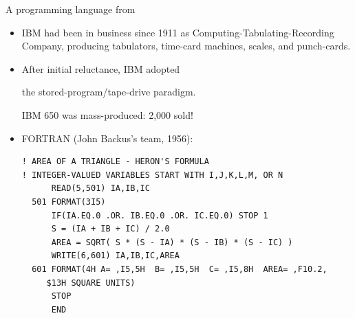 \documentclass[aspectratio=169]{beamer}
\begin{document}
\begin{frame}[fragile]{A programming language from }
\vspace{0.3 cm}
\begin{itemize}\setlength{\itemsep}{0.15 cm}
\item IBM had been in business since 1911 as Computing-Tabulating-Recording Company, producing tabulators, time-card machines, scales, and punch-cards.

\vspace{0.25 cm}


\vspace{-5.25 cm}

\item<2-> After initial reluctance, IBM adopted

the stored-program/tape-drive paradigm.

\vspace{0.1 cm}
IBM 650 was mass-produced: 2,000 sold!

\item<3-> FORTRAN (John Backus's team, 1956):

\vspace{0.25 cm}
\hspace{-1 cm}\begin{minipage}{0.5\linewidth}
\tiny
\begin{verbatim}
! AREA OF A TRIANGLE - HERON'S FORMULA
! INTEGER-VALUED VARIABLES START WITH I,J,K,L,M, OR N
      READ(5,501) IA,IB,IC
  501 FORMAT(3I5)
      IF(IA.EQ.0 .OR. IB.EQ.0 .OR. IC.EQ.0) STOP 1
      S = (IA + IB + IC) / 2.0
      AREA = SQRT( S * (S - IA) * (S - IB) * (S - IC) )
      WRITE(6,601) IA,IB,IC,AREA
  601 FORMAT(4H A= ,I5,5H  B= ,I5,5H  C= ,I5,8H  AREA= ,F10.2,
     $13H SQUARE UNITS)
      STOP
      END
\end{verbatim}
\end{minipage}

\vspace{0.25 cm}
\end{itemize}
\end{frame}
\end{document}
